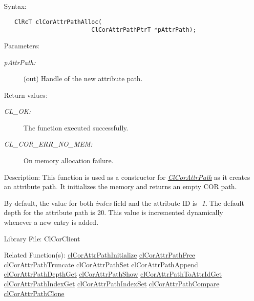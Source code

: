\begin{Desc}
\item[Syntax:]

\footnotesize\begin{verbatim}   ClRcT clCorAttrPathAlloc(
                         ClCorAttrPathPtrT *pAttrPath);
\end{verbatim}
\normalsize
\end{Desc}
\begin{Desc}
\item[Parameters:]
\begin{description}
\item[{\em p\-Attr\-Path:}](out) Handle of the new attribute path.\end{description}
\end{Desc}
\begin{Desc}
\item[Return values:]
\begin{description}
\item[{\em CL\_\-OK:}]The function executed successfully. \item[{\em CL\_\-COR\_\-ERR\_\-NO\_\-MEM:}]On memory allocation failure.\end{description}
\end{Desc}
\begin{Desc}
\item[Description:]This function is used as a constructor for {\em \hyperlink{struct_cl_cor_attr_path}{Cl\-Cor\-Attr\-Path}\/} as it creates an attribute path. It initializes the memory and returns an empty COR path. \par
 \par
 By default, the value for both {\em index\/} field and the attribute ID is {\em -1\/}. The default depth for the attribute path is 20. This value is incremented dynamically whenever a new entry is added.\end{Desc}
\begin{Desc}
\item[Library File:]Cl\-Cor\-Client\end{Desc}
\begin{Desc}
\item[Related Function(s):]\hyperlink{group__group13}{cl\-Cor\-Attr\-Path\-Initialize} \hyperlink{group__group13}{cl\-Cor\-Attr\-Path\-Free} \hyperlink{group__group13}{cl\-Cor\-Attr\-Path\-Truncate} \hyperlink{group__group13}{cl\-Cor\-Attr\-Path\-Set} \hyperlink{group__group13}{cl\-Cor\-Attr\-Path\-Append} \hyperlink{group__group13}{cl\-Cor\-Attr\-Path\-Depth\-Get} \hyperlink{group__group13}{cl\-Cor\-Attr\-Path\-Show} \hyperlink{group__group13}{cl\-Cor\-Attr\-Path\-To\-Attr\-Id\-Get} \hyperlink{group__group13}{cl\-Cor\-Attr\-Path\-Index\-Get} \hyperlink{group__group13}{cl\-Cor\-Attr\-Path\-Index\-Set} \hyperlink{group__group13}{cl\-Cor\-Attr\-Path\-Compare} \hyperlink{group__group13}{cl\-Cor\-Attr\-Path\-Clone} \end{Desc}
